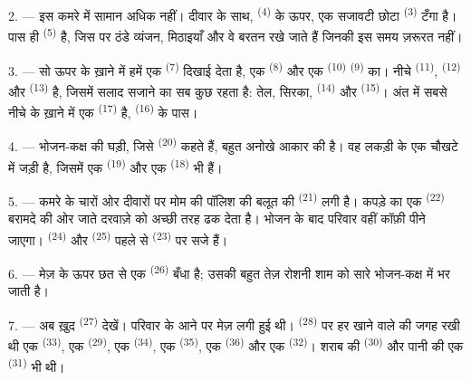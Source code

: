 2. --- इस कमरे में सामान अधिक नहीं। दीवार के साथ, 
\textsuperscript{(4)} के ऊपर, एक सजावटी छोटा  \textsuperscript{(3)}
टँगा है। पास ही  \textsuperscript{(5)} है, जिस पर ठंडे
व्यंजन, मिठाइयाँ और वे बरतन रखे जाते हैं जिनकी इस समय ज़रूरत नहीं।

3. --- सो ऊपर के ख़ाने में हमें एक  \textsuperscript{(7)}
दिखाई देता है, एक  \textsuperscript{(8)} और एक 
\textsuperscript{(10)}  \textsuperscript{(9)} का। नीचे
 \textsuperscript{(11)},  \textsuperscript{(12)} और
 \textsuperscript{(13)} है, जिसमें सलाद सजाने का सब कुछ
रहता है: तेल, सिरका,  \textsuperscript{(14)} और 
\textsuperscript{(15)}। अंत में सबसे नीचे के ख़ाने में एक  \textsuperscript{(17)} है,
 \textsuperscript{(16)} के पास।

4. --- भोजन-कक्ष की घड़ी, जिसे  \textsuperscript{(20)} कहते
हैं, बहुत अनोखे आकार की है। वह लकड़ी के एक चौखटे में जड़ी है, जिसमें एक
 \textsuperscript{(19)} और एक 
\textsuperscript{(18)} भी हैं।

\VUsaut{4.6mm}
\VUsaut{3.0mm}

5. --- कमरे के चारों ओर दीवारों पर मोम की पॉलिश की बलूत की
 \textsuperscript{(21)} लगी है। कपड़े का एक
 \textsuperscript{(22)} बरामदे की ओर जाते दरवाज़े को अच्छी
तरह ढक देता है। भोजन के बाद परिवार वहीं कॉफ़ी पीने जाएगा।
 \textsuperscript{(24)} और  \textsuperscript{(25)}
पहले से  \textsuperscript{(23)} पर सजे हैं।

6. --- मेज़ के ऊपर छत से एक  \textsuperscript{(26)} बँधा है;
उसकी बहुत तेज़ रोशनी शाम को सारे भोजन-कक्ष में भर जाती है।

7. --- अब ख़ुद  \textsuperscript{(27)} देखें। परिवार के आने
पर मेज़ लगी हुई थी।  \textsuperscript{(28)} पर हर खाने वाले की जगह
रखी थी एक  \textsuperscript{(33)}, एक 
\textsuperscript{(29)}, एक  \textsuperscript{(34)}, एक 
\textsuperscript{(35)}, एक  \textsuperscript{(36)} और एक
 \textsuperscript{(32)}। शराब की 
\textsuperscript{(30)} और पानी की एक  \textsuperscript{(31)} भी थी।

